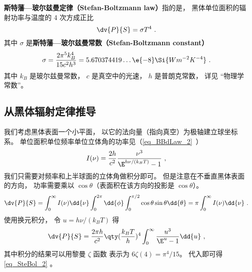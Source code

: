 
\textbf{斯特藩—玻尔兹曼定律（Stefan-Boltzmann law）}指的是， 黑体单位面积的辐射功率与温度的 4 次方成正比
\begin{equation}\label{eq_SteBol_2}
\dv{P}{S} = \sigma T^4~.
\end{equation}
其中 $\sigma$ 是\textbf{斯特藩—玻尔兹曼常数（Stefan-Boltzmann constant）}
\begin{equation}
\sigma = \frac{2\pi^5k_B^4}{15c^2h^3} = 5.670374419\dots \e{-8} \Si{Wm^{-2}K^{-4}}~.
\end{equation}
其中 $k_B$ 是玻尔兹曼常数， $c$ 是真空中的光速， $h$ 是普朗克常数， 详见 “物理学常数”。

\subsection{从黑体辐射定律推导}

我们考虑黑体表面一个小平面， 以它的法向量（指向真空）为极轴建立球坐标系。 单位面积单位频率单位立体角的功率见（\autoref{eq_BBdLaw_2}~）
\begin{equation}\label{eq_SteBol_1}
I(\nu) = \frac{2h}{c^2} \frac{\nu^3}{\E^{h\nu/(k_B T)} - 1}~,
\end{equation}
我们只需要对频率和上半球面的立体角做积分即可。 但是注意在不垂直黑体表面的方向， 功率需要乘以 $\cos\theta$（表面积在该方向的投影是 $\cos\theta$）。
\begin{equation}
\dv{P}{S} = \int_0^\infty I(\nu) \dd{\nu} \int_0^{2\pi} \dd{\phi} \int_0^{\pi/2}\cos\theta\sin\theta\dd{\theta}
= \pi \int_0^\infty I(\nu) \dd{\nu}~.
\end{equation}
使用换元积分， 令 $u = h\nu/(k_BT)$ 得
\begin{equation}
\dv{P}{S} = \frac{2\pi h}{c^2} \qty(\frac{k_B T}{h})^4 \int_0^\infty \frac{u^3}{\E^u - 1}\dd{u}~,
\end{equation}
其中积分的结果可以用黎曼 $\zeta$ 函数%
表示为 $6\zeta(4) = \pi^4/15$。 代入即可得\autoref{eq_SteBol_2} 。%
